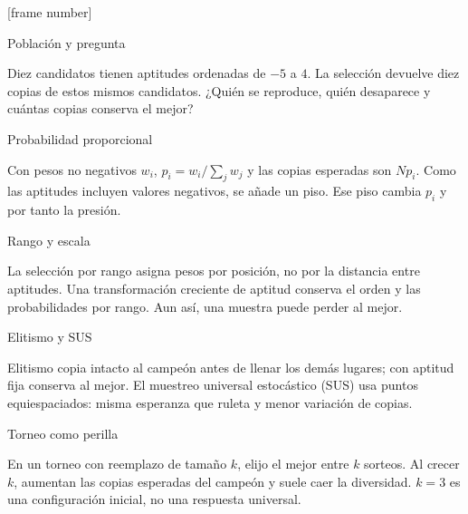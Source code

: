 


[frame number]

\date{}




\begin{frame}{Población y pregunta}

Diez candidatos tienen aptitudes ordenadas de $-5$ a $4$. La selección devuelve diez copias de estos mismos candidatos. ¿Quién se reproduce, quién desaparece y cuántas copias conserva el mejor?

\end{frame}

\begin{frame}{Probabilidad proporcional}

Con pesos no negativos $w_i$, $p_i=w_i/\sum_j w_j$ y las copias esperadas son $Np_i$. Como las aptitudes incluyen valores negativos, se añade un piso. Ese piso cambia $p_i$ y por tanto la presión.

\end{frame}

\begin{frame}{Rango y escala}

La selección por rango asigna pesos por posición, no por la distancia entre aptitudes. Una transformación creciente de aptitud conserva el orden y las probabilidades por rango. Aun así, una muestra puede perder al mejor.

\end{frame}

\begin{frame}{Elitismo y SUS}

Elitismo copia intacto al campeón antes de llenar los demás lugares; con aptitud fija conserva al mejor. El muestreo universal estocástico (SUS) usa puntos equiespaciados: misma esperanza que ruleta y menor variación de copias.

\end{frame}

\begin{frame}{Torneo como perilla}

En un torneo con reemplazo de tamaño $k$, elijo el mejor entre $k$ sorteos. Al crecer $k$, aumentan las copias esperadas del campeón y suele caer la diversidad. $k=3$ es una configuración inicial, no una respuesta universal.

\end{frame}

